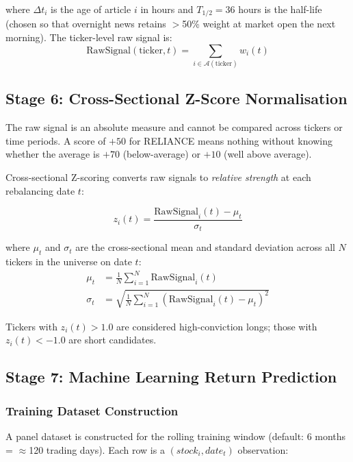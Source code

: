 \documentclass[12pt, a4paper]{article}
\begin{document}
where $\Delta t_i$ is the age of article $i$ in hours and $T_{1/2} = 36$ hours is the half-life (chosen so that overnight news retains $>$50\% weight at market open the next morning). The ticker-level raw signal is:
\begin{equation}
    \text{RawSignal}(\text{ticker}, t) = \sum_{i \in \mathcal{A}(\text{ticker})} w_i(t)
\end{equation}

\subsection{Stage 6: Cross-Sectional Z-Score Normalisation}

The raw signal is an absolute measure and cannot be compared across tickers or time periods. A score of $+50$ for RELIANCE means nothing without knowing whether the average is $+70$ (below-average) or $+10$ (well above average).

Cross-sectional Z-scoring converts raw signals to \textit{relative strength} at each rebalancing date $t$:

\begin{equation}
    \boxed{z_i(t) = \frac{\text{RawSignal}_i(t) - \mu_t}{\sigma_t}}
    \label{eq:zscore}
\end{equation}

where $\mu_t$ and $\sigma_t$ are the cross-sectional mean and standard deviation across all $N$ tickers in the universe on date $t$:
\begin{align}
    \mu_t &= \frac{1}{N}\sum_{i=1}^{N} \text{RawSignal}_i(t) \\
    \sigma_t &= \sqrt{\frac{1}{N}\sum_{i=1}^{N}\left(\text{RawSignal}_i(t) - \mu_t\right)^2}
\end{align}

Tickers with $z_i(t) > 1.0$ are considered high-conviction longs; those with $z_i(t) < -1.0$ are short candidates.

\subsection{Stage 7: Machine Learning Return Prediction}

\subsubsection{Training Dataset Construction}

A panel dataset is constructed for the rolling training window (default: 6 months = $\approx$120 trading days). Each row is a $(stock_i, date_t)$ observation:
\end{document}
